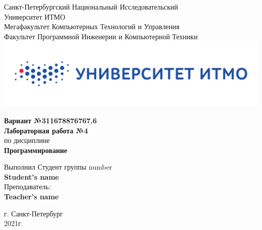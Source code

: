 \documentclass[12pt,onecolumn]{article}
\begin{document}
\setcounter{tocdepth}{4}
\begin{center}
    Санкт-Петербургский Национальный Исследовательский\\ 
    Университет ИТМО\\
    Мегафакультет Компьютерных Технологий и Управления\\
    Факультет Программной Инженерии и Компьютерной Техники \\
    \includegraphics[scale=0.3]{itm.jpg} %
\end{center}
\vspace{1cm}


\begin{center}
    \large \textbf{Вариант №311678876767.6}\\
    \textbf{Лабораторная работа №4}\\
    по дисциплине\\
    \textbf{Программирование}
\end{center}

\vspace{2cm}

\begin{flushright}
  Выполнил Студент  группы number\\
  \textbf{Student's name}\\
  Преподаватель: \\
  \textbf{Teacher's name}\\
\end{flushright}

\vspace{10cm}
\begin{center}
    г. Санкт-Петербург\\
    2021г.
\end{center}
\newpage
\tableofcontents
\newpage
\end{document}

